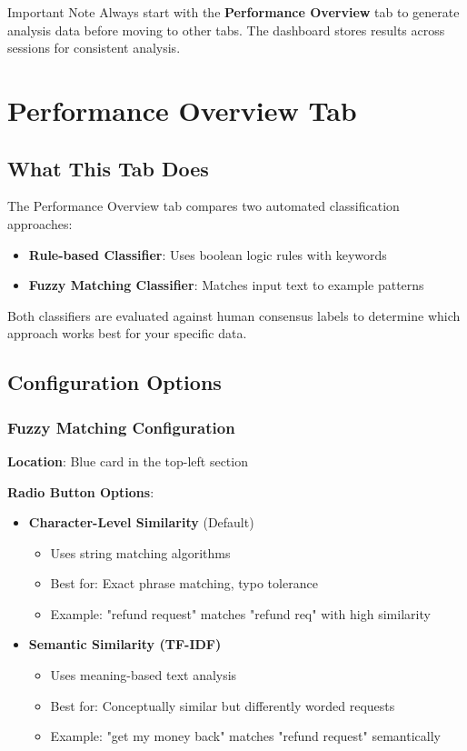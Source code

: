 \documentclass[11pt,a4paper]{article}
\begin{document}
\begin{infobox}{Important Note}
Always start with the \textbf{Performance Overview} tab to generate analysis data before moving to other tabs. The dashboard stores results across sessions for consistent analysis.
\end{infobox}

\section{Performance Overview Tab}

\subsection{What This Tab Does}
The Performance Overview tab compares two automated classification approaches:
\begin{itemize}
    \item \textbf{Rule-based Classifier}: Uses boolean logic rules with keywords
    \item \textbf{Fuzzy Matching Classifier}: Matches input text to example patterns
\end{itemize}

Both classifiers are evaluated against human consensus labels to determine which approach works best for your specific data.

\subsection{Configuration Options}

\subsubsection{Fuzzy Matching Configuration}
\textbf{Location}: Blue card in the top-left section

\textbf{Radio Button Options}:
\begin{itemize}
    \item \textbf{Character-Level Similarity} (Default)
    \begin{itemize}
        \item Uses string matching algorithms
        \item Best for: Exact phrase matching, typo tolerance
        \item Example: "refund request" matches "refund req" with high similarity
    \end{itemize}
    \item \textbf{Semantic Similarity (TF-IDF)}
    \begin{itemize}
        \item Uses meaning-based text analysis
        \item Best for: Conceptually similar but differently worded requests
        \item Example: "get my money back" matches "refund request" semantically
    \end{itemize}
\end{itemize}
\end{document}
